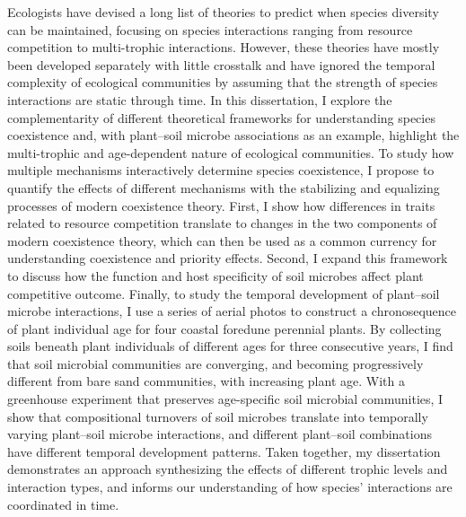 Ecologists have devised a long list of theories to predict when species diversity can be maintained, focusing on species interactions ranging from resource competition to multi-trophic interactions. 
However, these theories have mostly been developed separately with little crosstalk and have ignored the temporal complexity of ecological communities by assuming that the strength of species interactions are static through time.
In this dissertation, I explore the complementarity of different theoretical frameworks for understanding species coexistence and, with plant--soil microbe associations as an example, highlight the multi-trophic and age-dependent nature of ecological communities. 
To study how multiple mechanisms interactively determine species coexistence, I propose to quantify the effects of different mechanisms with the stabilizing and equalizing processes of modern coexistence theory. 
First, I show how differences in traits related to resource competition translate to changes in the two components of modern coexistence theory, which can then be used as a common currency for understanding coexistence and priority effects.
Second, I expand this framework to discuss how the function and host specificity of soil microbes affect plant competitive outcome.
Finally, to study the temporal development of plant--soil microbe interactions, I use a series of aerial photos to construct a chronosequence of plant individual age for four coastal foredune perennial plants.
By collecting soils beneath plant individuals of different ages for three consecutive years, I find that soil microbial communities are converging, and becoming progressively different from bare sand communities, with increasing plant age.
With a greenhouse experiment that preserves age-specific soil microbial communities, I show that compositional turnovers of soil microbes translate into temporally varying plant--soil microbe interactions, and different plant--soil combinations have different temporal development patterns.
Taken together, my dissertation demonstrates an approach synthesizing the effects of different trophic levels and interaction types, and informs our understanding of how species' interactions are coordinated in time.